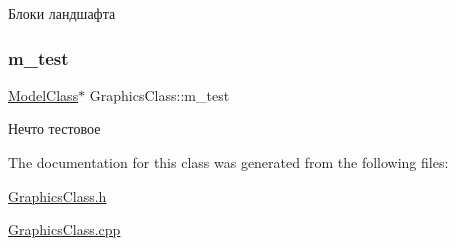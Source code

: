 Блоки ландшафта 

\mbox{\label{class_graphics_class_aa63d5284daefe96b58c9d45e02b51e2d}} 
\subsubsection{\texorpdfstring{m\+\_\+test}{m\_test}}
{\footnotesize\ttfamily \hyperlink{class_model_class}{Model\+Class}$\ast$ Graphics\+Class\+::m\+\_\+test\hspace{0.3cm}{\ttfamily [private]}}



Нечто тестовое 



The documentation for this class was generated from the following files\+:\begin{DoxyCompactItemize}
\item 
\hyperlink{_graphics_class_8h}{Graphics\+Class.\+h}\item 
\hyperlink{_graphics_class_8cpp}{Graphics\+Class.\+cpp}\end{DoxyCompactItemize}
